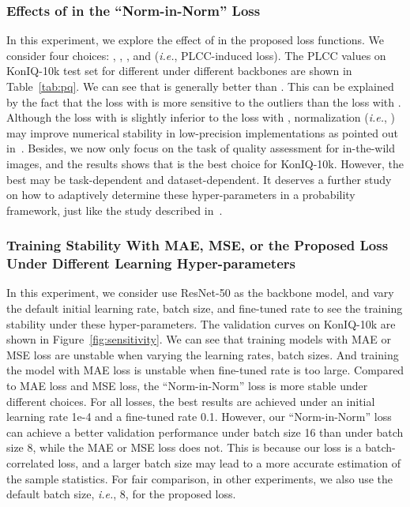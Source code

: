 \documentclass[sigconf]{acmart}
\begin{document}
\subsubsection{Effects of  in the ``Norm-in-Norm'' Loss} 
In this experiment, we explore the effect of  in the proposed loss functions.
We consider four choices: , , , and  (\textit{i.e.}, PLCC-induced loss).
The PLCC values on KonIQ-10k test set for different  under different backbones are shown in Table~\ref{tab:pq}.
We can see that  is generally better than .
This can be explained by the fact that the loss with  is more sensitive to the outliers than the loss with .
Although the loss with  is slightly inferior to the loss with ,  normalization (\textit{i.e.}, ) may improve numerical stability in low-precision implementations as pointed out in~\cite{hoffer2018norm}.
Besides, we now only focus on the task of quality assessment for in-the-wild images, and the results shows that  is the best choice for KonIQ-10k.
However, the best  may be task-dependent and dataset-dependent.
It deserves a further study on how to adaptively determine these hyper-parameters in a probability framework, just like the study described in~\cite{barron2019general}.
\subsubsection{Training Stability With MAE, MSE, or the Proposed Loss Under Different Learning Hyper-parameters} 
In this experiment, we consider use ResNet-50 as the backbone model, and vary the default initial learning rate, batch size, and fine-tuned rate to see the training stability under these hyper-parameters.
The validation curves on KonIQ-10k are shown in Figure~\ref{fig:sensitivity}. 
We can see that training models with MAE or MSE loss are unstable when varying the learning rates, batch sizes.
And training the model with MAE loss is unstable when fine-tuned rate is too large.
Compared to MAE loss and MSE loss, the ``Norm-in-Norm'' loss is more stable under different choices.
For all losses, the best results are achieved under an initial learning rate 1e-4 and a fine-tuned rate 0.1.
However, our ``Norm-in-Norm'' loss can achieve a better validation performance under batch size 16 than under batch size 8, while the MAE or MSE loss does not.
This is because our loss is a batch-correlated loss, and a larger batch size may lead to a more accurate estimation of the sample statistics.
For fair comparison, in other experiments, we also use the default batch size, \textit{i.e.}, 8, for the proposed loss.
\end{document}
